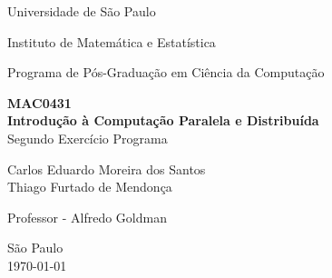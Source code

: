 \documentclass[brazil, a4paper,12pt]{article}
\begin{document}
\begin{titlepage}

  \vfill

  \begin{center}
    \begin{large}
      Universidade de São Paulo
    \end{large}
  \end{center}

  \begin{center}
    \begin{large}
      Instituto de Matemática e Estatística
    \end{large}
  \end{center}

  \begin{center}
    \begin{large}
      Programa de Pós-Graduação em Ciência da Computação
    \end{large}
  \end{center}

  \vfill

  \begin{center}
    \begin{Large}
        \textbf{MAC0431}\\
        \textbf{Introdução à Computação Paralela e Distribuída}\\
          Segundo Exercício Programa\\
    \end{Large}
  \end{center}

  \vfill

  \begin{center}
    \begin{large}
      Carlos Eduardo Moreira dos Santos\\
      Thiago Furtado de Mendonça
    \end{large}
  \end{center}

  \begin{center}
    \begin{large}
      Professor - Alfredo Goldman\\
    \end{large}
  \end{center}

  \vfill

  \begin{center}
    \begin{large}
      São Paulo \\
      \today \\
    \end{large}
  \end{center}

\clearpage
\tableofcontents 
\end{titlepage}
\end{document}
